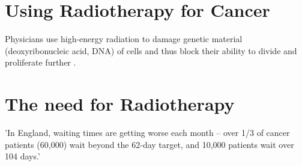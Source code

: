 \documentclass[11pt]{article}
\begin{document}
\section{Using Radiotherapy for Cancer}

Physicians use high-energy radiation to damage genetic material (deoxyribonucleic acid, DNA) of cells and thus block their ability to divide and proliferate further \cite{radiotherapy-advances}.

\section{The need for Radiotherapy}


'In England, waiting times are getting worse each month – over 1/3 of cancer patients (60,000) wait beyond the 62-day target, and 10,000 patients wait over 104 days.'

\printbibliography
\end{document}
